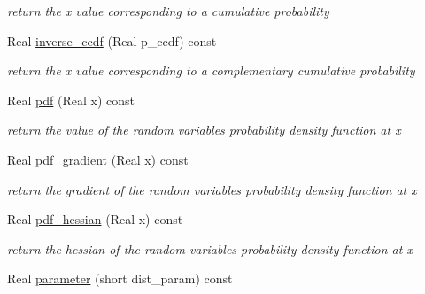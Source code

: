 \begin{DoxyCompactItemize}
\begin{DoxyCompactList}\small\item\em return the x value corresponding to a cumulative probability \end{DoxyCompactList}\item 
Real \hyperlink{classPecos_1_1LoguniformRandomVariable_afda003a1f59ff6930902cd5c8601f49b}{inverse\+\_\+ccdf} (Real p\+\_\+ccdf) const \label{classPecos_1_1LoguniformRandomVariable_afda003a1f59ff6930902cd5c8601f49b}

\begin{DoxyCompactList}\small\item\em return the x value corresponding to a complementary cumulative probability \end{DoxyCompactList}\item 
Real \hyperlink{classPecos_1_1LoguniformRandomVariable_a8ec69265f428e17c1707133cb137a819}{pdf} (Real x) const \label{classPecos_1_1LoguniformRandomVariable_a8ec69265f428e17c1707133cb137a819}

\begin{DoxyCompactList}\small\item\em return the value of the random variable\textquotesingle{}s probability density function at x \end{DoxyCompactList}\item 
Real \hyperlink{classPecos_1_1LoguniformRandomVariable_aaa7ca3718abc034be7629af5594efca0}{pdf\+\_\+gradient} (Real x) const \label{classPecos_1_1LoguniformRandomVariable_aaa7ca3718abc034be7629af5594efca0}

\begin{DoxyCompactList}\small\item\em return the gradient of the random variable\textquotesingle{}s probability density function at x \end{DoxyCompactList}\item 
Real \hyperlink{classPecos_1_1LoguniformRandomVariable_a514a0abe97269ac6e003f43683d9137e}{pdf\+\_\+hessian} (Real x) const \label{classPecos_1_1LoguniformRandomVariable_a514a0abe97269ac6e003f43683d9137e}

\begin{DoxyCompactList}\small\item\em return the hessian of the random variable\textquotesingle{}s probability density function at x \end{DoxyCompactList}\item 
Real \hyperlink{classPecos_1_1LoguniformRandomVariable_aa891dab1ae9a225f493e3a0e5032b778}{parameter} (short dist\+\_\+param) const \label{classPecos_1_1LoguniformRandomVariable_aa891dab1ae9a225f493e3a0e5032b778}


\end{DoxyCompactItemize}
